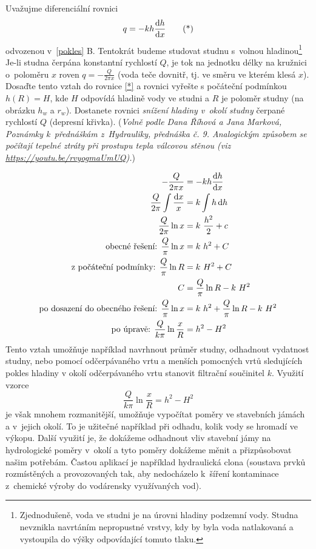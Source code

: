 Uvažujme diferenciální rovnici
\begin{equation}
q=-kh\frac{\mathrm{d}h}{\mathrm{d}x} \tag{*}\label{*}
\end{equation}
odvozenou v \ref{pokles} B. Tentokrát budeme studovat studnu s volnou hladinou\footnote{Zjednodušeně, voda ve studni je na úrovni hladiny podzemní vody. Studna nevznikla navrtáním nepropustné vrstvy, kdy by byla voda natlakovaná a vystoupila do výšky odpovídající tomuto tlaku.} Je-li studna čerpána konstantní rychlostí $Q$, je tok na jednotku délky na kružnici o poloměru $x$ roven $q=-\frac {Q}{2\pi x}$ (voda teče dovnitř, tj. ve směru ve kterém klesá $x$). Dosaďte tento vztah do rovnice \eqref{*} a rovnici vyřešte s počáteční podmínkou $h(R)=H$, kde $H$ odpovídá hladině vody ve studni a $R$ je poloměr studny (na obrázku $h_w$ a $r_w$). Dostanete rovnici \textit{snížení hladiny v okolí studny} čerpané rychlostí $Q$ (depresní křivka).
(\textit{Volně podle Dana Říhová a Jana Marková, Poznámky k přednáškám z Hydrauliky, přednáška č. 9. Analogickým způsobem se počítají tepelné ztráty při prostupu tepla válcovou stěnou (viz \url{https://youtu.be/rvyogmaUmUQ}).})


\reseni
$$
\begin{aligned}
  -\frac{Q}{2\pi x}&=-kh\derivace hx\\
  \frac{Q }{2\pi} \int \frac{\mathrm {d}x}{x}&=k\int h\,\mathrm d h\\
  \frac{Q }{2\pi}\ln x&=k \frac {h^2}2 +c\\
\text{obecné řešení: }  \frac{Q }{\pi}\ln x&=k {h^2} +C\\
\text{z počáteční podmínky: }  \frac{Q }{\pi}\ln R&=k {H^2} +C\\
  C&=\frac{Q }{\pi}\ln R-k {H^2}\\
\text{po dosazení do obecného řešení: }   \frac{Q }{\pi}\ln x&=k {h^2} +\frac{Q }{\pi}\ln R-k {H^2}\\
\text{po úpravě: }  \frac{Q }{k\pi}\ln \frac {x}{R}&={h^2} - {H^2}\\
\end{aligned}
$$
Tento vztah umožňuje například navrhnout průměr studny, odhadnout
vydatnost studny, nebo pomocí odčerpávaného vrtu a menších pomocných
vrtů sledujících pokles hladiny v okolí odčerpávaného vrtu stanovit
filtrační součinitel $k$. Využití vzorce
\begin{equation*}
  \frac{Q }{k\pi}\ln \frac {x}{R}={h^2} - {H^2}
\end{equation*}
je však mnohem rozmanitější,
umožňuje vypočítat poměry ve stavebních jámách a v jejich okolí. To je
užitečné například při odhadu, kolik vody se hromadí ve výkopu. Další
využití je, že dokážeme odhadnout vliv stavební jámy na hydrologické
poměry v okolí a tyto poměry dokážeme měnit a přizpůsobovat našim
potřebám. Častou aplikací je například hydraulická clona (soustava
prvků rozmístěných a provozovaných tak, aby nedocházelo k šíření kontaminace z chemické výroby do vodárensky využívaných vod).

